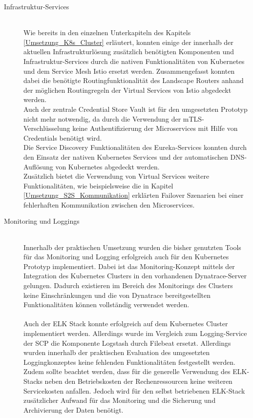 \begin{description}
\item[Infrastruktur-Services] \hfill \\
Wie bereits in den einzelnen Unterkapiteln des Kapitels \ref{Umsetzung_K8s_Cluster} erläutert, konnten einige der innerhalb der aktuellen Infrastrukturlösung zusätzlich benötigten Komponenten und Infrastruktur-Services durch die nativen Funktionalitäten von Kubernetes und dem Service Mesh Istio ersetzt werden. Zusammengefasst konnten dabei die benötigte Routingfunktionalität des Landscape Routers anhand der möglichen Routingregeln der Virtual Services von Istio abgedeckt werden.\\
Auch der zentrale Credential Store Vault ist für den umgesetzten Prototyp nicht mehr notwendig, da durch die Verwendung der \ac{mTLS}-Verschlüsselung keine Authentifizierung der Microservices mit Hilfe von Credentials benötigt wird.\\
Die Service Discovery Funktionalitäten des Eureka-Services konnten durch den Einsatz der nativen Kubernetes Services und der automatischen \ac{DNS}-Auflösung von Kubernetes abgedeckt werden. \\
Zusätzlich bietet die Verwendung von Virtual Services weitere Funktionalitäten, wie beispielsweise die in Kapitel \ref{Umsetzung_S2S_Kommunikation} erklärten Failover Szenarien bei einer fehlerhaften Kommunikation zwischen den Microservices.
\\
\item[Monitoring und Loggings] \hfill \\
Innerhalb der praktischen Umsetzung wurden die bisher genutzten Tools für das Monitoring und Logging erfolgreich auch für den Kubernetes Prototyp implementiert.
Dabei ist das Monitoring-Konzept mittels der Integration des Kubernetes Clusters in den vorhandenen Dynatrace-Server gelungen. Dadurch existieren im Bereich des Monitorings des Clusters keine Einschränkungen und die von Dynatrace bereitgestellten Funktionalitäten können vollständig verwendet werden.\\
\\
Auch der ELK Stack konnte erfolgreich auf dem Kubernetes Cluster implementiert werden. Allerdings wurde im Vergleich zum Logging-Service der \ac{SCP} die Komponente Logstash durch Filebeat ersetzt. Allerdings wurden innerhalb der praktischen Evaluation des umgesetzten Loggingkonzeptes keine fehlenden Funktionalitäten festgestellt werden.\\
Zudem sollte beachtet werden, dass für die generelle Verwendung des ELK-Stacks neben den Betriebskosten der Rechenressourcen keine weiteren Servicekosten anfallen. Jedoch wird für den selbst betriebenen ELK-Stack zusätzlicher Aufwand für das Monitoring und die Sicherung und Archivierung der Daten benötigt. 

\end{description}